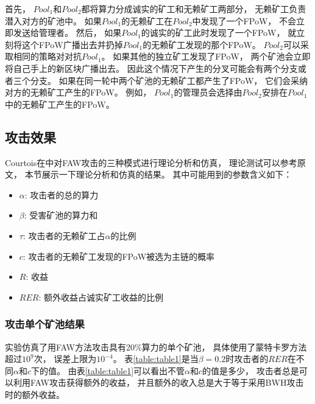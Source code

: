 \documentclass[a4paper, 11pt]{article}
\begin{document}
\begin{CJK*}{UTF8}{gbsn}
    首先，
    $Pool_1$和$Pool_2$都将算力分成诚实的矿工和无赖矿工两部分，
    无赖矿工负责潜入对方的矿池中。
    如果$Pool_1$的无赖矿工在$Pool_2$中发现了一个FPoW，
    不会立即发送给管理者。
    然后，
    如果$Pool_1$的诚实的矿工此时发现了一个FPoW，
    就立刻将这个FPoW广播出去并扔掉$Pool_1$的无赖矿工发现的那个FPoW。
    $Pool_2$可以采取相同的策略对对抗$Pool_1$。  
    如果其他的独立矿工发现了FPoW，
    两个矿池会立即将自己手上的新区块广播出去。
    因此这个情况下产生的分叉可能会有两个分支或者三个分支。
    如果在同一轮中两个矿池的无赖矿工都产生了FPoW，
    它们会采纳对方的无赖矿工产生的FPoW。
    例如，
    $Pool_1$的管理员会选择由$Pool_2$安排在$Pool_1$中的无赖矿工产生的FPoW。

    \subsection{攻击效果}

    \indent

    Courtois在\cite{ref_FAW}中对FAW攻击的三种模式进行理论分析和仿真，
    理论测试可以参考原文，
    本节展示一下理论分析和仿真的结果。
    其中可能用到的参数含义如下：

    \begin{itemize}
        \item $\alpha$: 攻击者的总的算力 
        \item $\beta$: 受害矿池的算力和
        \item $\tau$: 攻击者的无赖矿工占$\alpha$的比例
        \item $c$: 攻击者的无赖矿工发现的FPoW被选为主链的概率
        \item $R$: 收益
        \item $RER$: 额外收益占诚实矿工收益的比例
    \end{itemize}

    \subsubsection{攻击单个矿池结果}

    \indent

    实验仿真了用FAW方法攻击具有20\%算力的单个矿池，
    具体使用了蒙特卡罗方法超过$10^9$次，
    误差上限为$10^{-4}$。
    表\ref{table:table1}是当$\beta=0.2$时攻击者的$RER$在不同$\alpha$和$c$下的值。
    由表\ref{table:table1}可以看出不管$\alpha$和$c$的值是多少，
    攻击者总是可以利用FAW攻击获得额外的收益，
    并且额外的收入总是大于等于采用BWH攻击时的额外收益。



\end{CJK*}
\end{document}

